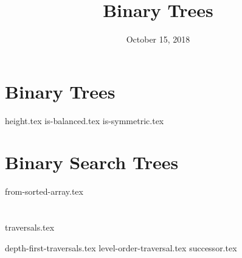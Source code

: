 \documentclass[11pt]{exam}
\title{Binary Trees}
\date{October 15, 2018}
\begin{document}
\maketitle

\section{Binary Trees}
\begin{questions}
{height.tex}
{is-balanced.tex}
\clearpage
{}\vspace*{-2em}
{is-symmetric.tex}
\end{questions}

\clearpage

\section{Binary Search Trees}
\begin{questions}
{from-sorted-array.tex}
\end{questions}

\clearpage


\section{}
{traversals.tex}
\begin{questions}
{depth-first-traversals.tex}
{level-order-traversal.tex}
{successor.tex}
\end{questions}
\end{document}
